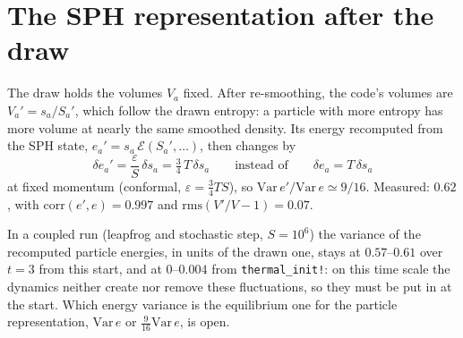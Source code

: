 \documentclass[11pt,aps,preprint,nofootinbib,superscriptaddress,tightenlines]{revtex4-2}
\def\st{\begin{equation}}
\def\stp{\end{equation}}
\begin{document}
\section{The SPH representation after the draw}
\label{sec:sph}

The draw holds the volumes $V_a$ fixed.  After re-smoothing, the code's volumes are
$V_a'=s_a/S_a'$, which follow the drawn entropy: a particle with more entropy has more
volume at nearly the same smoothed density.  Its energy recomputed from the SPH state,
$e_a'=s_a\,\mathcal E(S_a',\dots)$, then changes by
\st
\delta e_a'=\frac{\varepsilon}{S}\,\delta s_a=\tfrac34\,T\,\delta s_a
\qquad\text{instead of}\qquad \delta e_a=T\,\delta s_a
\stp
at fixed momentum (conformal, $\varepsilon=\tfrac34TS$), so $\mathrm{Var}\,e'/\mathrm{Var}\,e\simeq9/16$.
Measured: $0.62$, with $\mathrm{corr}(e',e)=0.997$ and $\mathrm{rms}(V'/V-1)=0.07$.

In a coupled run (leapfrog and stochastic step, $S=10^6$) the variance of the
recomputed particle energies, in units of the drawn one, stays at $0.57$--$0.61$ over
$t=3$ from this start, and at $0$--$0.004$ from \texttt{thermal\_init!}: on this time
scale the dynamics neither create nor remove these fluctuations, so they must be put in
at the start.  Which energy variance is the equilibrium one for the particle
representation, $\mathrm{Var}\,e$ or $\tfrac{9}{16}\mathrm{Var}\,e$, is open.
\end{document}
